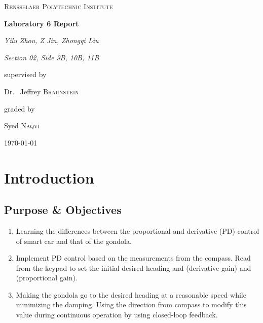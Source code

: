 \documentclass[12pt]{article}
\newcommand\code[2][]{
    \tikz[baseline=(s.base)]{
        \node(s)[
            rounded corners,
            fill=black!5,        %
            draw=black,          %
            text=black, %
            inner xsep =3pt,    %
            inner ysep =0pt,    %
            text height=2ex,    %
            text depth =1ex,    %
            #1                  %
        ]{\texttt{#2}};
    }
}
\begin{document}
\begin{titlepage}
	\begin{center}
	{\scshape\LARGE{Rensselaer Polytechnic Institute}\par}
	\vspace{3.5cm}
	{\huge\bfseries{Laboratory 6 Report}\par}
	\vspace{2cm}
	{\Large\itshape{Yilu Zhou, Z Jin, Zhongqi Liu}\par}
    {\Large\itshape{Section 02, Side 9B, 10B, 11B}\par}
	\vfill
	supervised by\par
	Dr.~ Jeffrey \textsc{Braunstein}\par
    graded by\par
    Syed \textsc{Naqvi}
	\vfill
	{\large \today\par}
    \end{center}
\end{titlepage}
\section{Introduction}
\subsection{Purpose \& Objectives}
\begin{enumerate}
    \item Learning the differences between the proportional and derivative (PD) control of smart car and that of the gondola.
    \item Implement PD control based on the measurements from the compass. Read from the keypad to set the initial-desired heading and \code{KD} (derivative gain) and \code{KP}(proportional gain).
    \item Making the gondola go to the desired heading at a reasonable speed while minimizing the damping. Using the direction from compass to modify this value during continuous operation by using closed-loop feedback.
\end{enumerate}
\end{document}
